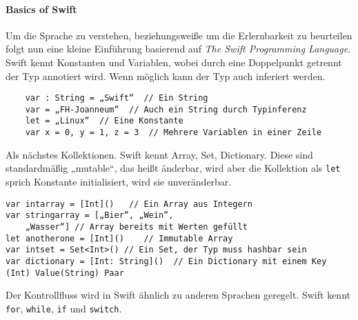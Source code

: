 \paragraph{Basics of Swift}
\label{para:basicsofswift}
Um die Sprache zu verstehen, beziehungsweiße um die Erlernbarkeit zu beurteilen folgt nun eine kleine Einführung basierend auf \textit{The Swift Programming Language}\parencite{swiftbook}.
Swift kennt Konstanten und Variablen, wobei durch eine Doppelpunkt getrennt der Typ annotiert wird. Wenn möglich kann der Typ auch inferiert werden.
\begin{lstlisting}
	var : String = „Swift“  // Ein String
	var = „FH-Joanneum“  // Auch ein String durch Typinferenz
 	let = „Linux“  // Eine Konstante
	var x = 0, y = 1, z = 3  // Mehrere Variablen in einer Zeile
\end{lstlisting}
Als nächstes Kollektionen. Swift kennt Array, Set, Dictionary. Diese sind standardmäßig „mutable“, das heißt änderbar, wird aber die Kollektion als \lstinline{let} sprich Konstante initialisiert, wird sie unveränderbar.
\begin{lstlisting}
var intarray = [Int]()   // Ein Array aus Integern
var stringarray = [„Bier“, „Wein“, 
	„Wasser“] // Array bereits mit Werten gefüllt
let anotherone = [Int]()	// Immutable Array
var intset = Set<Int>()	// Ein Set, der Typ muss hashbar sein
var dictionary = [Int: String]()  // Ein Dictionary mit einem Key (Int) Value(String) Paar
\end{lstlisting}
Der Kontrollfluss wird in Swift ähnlich zu anderen Sprachen geregelt. Swift kennt \lstinline{for}, \lstinline{while}, \lstinline{if} und \lstinline{switch}.
\swiftcode
